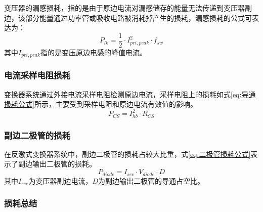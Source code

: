 变压器的漏感损耗，指的是由于原边电流对漏感储存的能量无法传递到变压器副边，该部分能量通过功率管或吸收电路被消耗掉产生的损耗，漏感损耗的公式可表达为：
\begin{equation}
    \label{eq:漏感损耗公式}
    P_{lk} = \frac{1}{2}\cdot I_{pri,peak}^2  \cdot f_{sw} 
\end{equation}
其中$I_{pri,peak}$指的是变压原边电感的峰值电流。
\fi

\subsubsection{电流采样电阻损耗}

变换器系统通过外接电流采样电阻检测原边电流，采样电阻上的损耗如式\eqref{eq:导通损耗公式}所示，主要受到采样电阻和原边电流有效值的影响。
\begin{equation}
    \label{eq:采样电阻损耗公式}
    P_{CS} = I_{hb}^2  \cdot R_{CS} 
\end{equation}


\subsubsection{副边二极管的损耗}

在反激式变换器系统中，副边二极管的损耗占较大比重，式\eqref{eq:二极管损耗公式}表示了副边输出二极管的损耗。
\begin{equation}
    \label{eq:二极管损耗公式}
    P_{diode} = I_{sec} \cdot V_{diode} \cdot D 
\end{equation}
其中$I_{sec}$为变压器副边电流，$D$为副边输出二极管的导通占空比。

\subsubsection{损耗总结}

